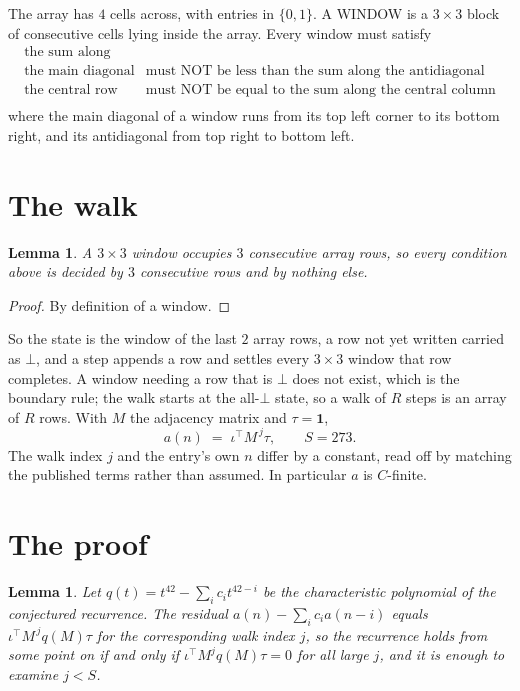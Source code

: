 \documentclass[11pt,a4paper]{article}
\theoremstyle{plain}
\newtheorem{lemma}[theorem]{Lemma}
\theoremstyle{definition}
\begin{document}
The array has $4$ cells across, with entries in $\{0,1\}$. A WINDOW is a $3\times3$ block
of consecutive cells lying inside the array. Every window must satisfy
\[
\begin{array}{ll}
\text{the sum along} & \text{} \\[2pt]
\text{the main diagonal} & \text{must NOT be less than the sum along the antidiagonal} \\
\text{the central row} & \text{must NOT be equal to the sum along the central column} \\
\end{array}
\]
where the main diagonal of a window runs from its top left corner to its bottom right, and its
antidiagonal from top right to bottom left.

\section{The walk}

\begin{lemma}\label{lem:win}
A $3\times3$ window occupies $3$ consecutive array rows, so every condition above is
decided by $3$ consecutive rows and by nothing else.
\end{lemma}

\begin{proof}
By definition of a window.
\end{proof}

So the state is the window of the last $2$ array rows, a row not yet written carried as
$\bot$, and a step appends a row and settles every $3\times3$ window that row completes. A
window needing a row that is $\bot$ does not exist, which is the boundary rule; the walk starts
at the all-$\bot$ state, so a walk of $R$ steps is an array of $R$ rows. With $M$ the adjacency
matrix and $\tau=\mathbf{1}$,
\[
a(n)\;=\;\iota^{\!\top}M^{\,j}\tau ,\qquad S=273.
\]
The walk index $j$ and the entry's own $n$ differ by a constant, read off by matching the
published terms rather than assumed. In particular $a$ is $C$-finite.

\section{The proof}

\begin{lemma}\label{lem:crit}
Let $q(t)=t^{42}-\sum_i c_it^{42-i}$ be the characteristic polynomial of the
conjectured recurrence. The residual $a(n)-\sum_ic_ia(n-i)$ equals
$\iota^{\!\top}M^{\,j}q(M)\tau$ for the corresponding walk index $j$, so the recurrence
holds from some point on if and only if $\iota^{\!\top}M^{j}q(M)\tau=0$ for all large $j$,
and it is enough to examine $j<S$.
\end{lemma}
\end{document}
